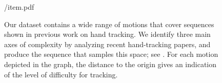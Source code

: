 \begin{figure}[t!]
\centering
\begin{overpic} 
[width=\linewidth]
{\currfiledir/item.pdf}
\end{overpic}
\caption{
% 
Our dataset contains a wide range of motions that cover sequences shown in previous work on hand tracking. We identify three main axes of complexity by analyzing recent hand-tracking papers, and produce the  sequence that samples this space; see \VideoSpace{}. 
For each motion depicted in the graph, the distance to the origin gives an indication of the level of difficulty for tracking.
% 
}
\label{fig:motiontypes}
\end{figure}